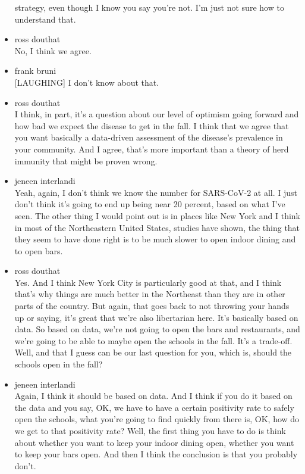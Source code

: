 \begin{itemize}
  strategy, even though I know you say you're not. I'm just not sure how
  to understand that.
\item
  ross douthat\\
  No, I think we agree.
\item
  frank bruni\\
  {[}LAUGHING{]} I don't know about that.
\item
  ross douthat\\
  I think, in part, it's a question about our level of optimism going
  forward and how bad we expect the disease to get in the fall. I think
  that we agree that you want basically a data-driven assessment of the
  disease's prevalence in your community. And I agree, that's more
  important than a theory of herd immunity that might be proven wrong.
\item
  jeneen interlandi\\
  Yeah, again, I don't think we know the number for SARS-CoV-2 at all. I
  just don't think it's going to end up being near 20 percent, based on
  what I've seen. The other thing I would point out is in places like
  New York and I think in most of the Northeastern United States,
  studies have shown, the thing that they seem to have done right is to
  be much slower to open indoor dining and to open bars.
\item
  ross douthat\\
  Yes. And I think New York City is particularly good at that, and I
  think that's why things are much better in the Northeast than they are
  in other parts of the country. But again, that goes back to not
  throwing your hands up or saying, it's great that we're also
  libertarian here. It's basically based on data. So based on data,
  we're not going to open the bars and restaurants, and we're going to
  be able to maybe open the schools in the fall. It's a trade-off. Well,
  and that I guess can be our last question for you, which is, should
  the schools open in the fall?
\item
  jeneen interlandi\\
  Again, I think it should be based on data. And I think if you do it
  based on the data and you say, OK, we have to have a certain
  positivity rate to safely open the schools, what you're going to find
  quickly from there is, OK, how do we get to that positivity rate?
  Well, the first thing you have to do is think about whether you want
  to keep your indoor dining open, whether you want to keep your bars
  open. And then I think the conclusion is that you probably don't.

\end{itemize}
